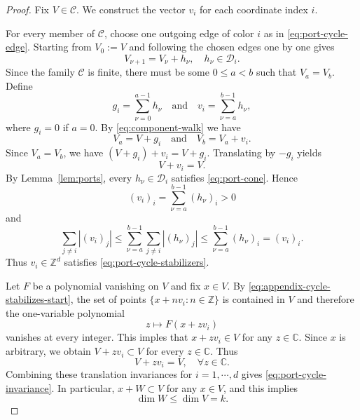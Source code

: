\documentclass[11pt,reqno]{amsart}
\newcommand\Z{\ensuremath{\mathbb{Z}}}
\newcommand\C{\ensuremath{\mathbb{C}}}
\theoremstyle{definition}
\theoremstyle{plain}
\numberwithin{equation}{section}
\begin{document}
\begin{proof}
    Fix $V\in \mathcal{C}$. We construct the vector $v_i$ for each coordinate index $i$.

    For every member of $\mathcal{C}$, choose one outgoing edge of color $i$ as in \eqref{eq:port-cycle-edge}. Starting from $V_0:=V$ and following the chosen edges one by one gives 
    \begin{equation}\label{eq:component-walk}
        V_{\nu+1}=V_{\nu}+h_\nu,\quad h_\nu \in \mathcal{D}_i.
    \end{equation}
    Since the family $\mathcal{C}$ is finite, there must be some $0\le a<b$ such that $V_a=V_b$. Define
    \begin{equation*}
        g_i=\sum_{\nu=0}^{a-1}h_\nu \quad  \text{and}\quad v_i=\sum_{\nu=a}^{b-1}h_\nu,
    \end{equation*}
    where $g_i=0$ if $a=0$. By \eqref{eq:component-walk} we have
    \begin{equation*}
        V_a=V+g_i \quad \text{and}\quad V_b=V_a+v_i.
    \end{equation*}
    Since $V_a=V_b$, we have $(V+g_i)+v_i=V+g_i$.
Translating by $-g_i$ yields
\begin{equation}\label{eq:appendix-cycle-stabilizes-start}
    V+v_i=V.
\end{equation}
By Lemma~\ref{lem:ports}, every $h_\nu \in \mathcal{D}_i$ satisfies \eqref{eq:port-cone}. Hence
\begin{equation*}
    (v_i)_i=\sum_{\nu=a}^{b-1}(h_\nu)_i>0
\end{equation*}
and
\begin{equation*}
    \sum_{j\neq i}|(v_i)_j|\le \sum_{\nu=a}^{b-1}\sum_{j\neq i}|(h_\nu)_j|\le \sum_{\nu=a}^{b-1}(h_\nu)_i=(v_i)_i.
\end{equation*}
Thus $v_i\in \Z^d$ satisfies \eqref{eq:port-cycle-stabilizers}. 

Let $F$ be a polynomial vanishing on $V$ and fix $x\in V$. By \eqref{eq:appendix-cycle-stabilizes-start}, the set of points $\lbrace x+nv_i:n\in\Z\rbrace$ is contained in $V$ and therefore the one-variable polynomial
\begin{equation*}
    z\longmapsto F(x+zv_i)
\end{equation*}
vanishes at every integer. This imples that $x+zv_i\in V$ for any $z\in \C$. Since $x$ is arbitrary, we obtain $V+zv_i\subset V$ for every $z\in \C$. Thus
\begin{equation*}
    V+zv_i=V,\quad \forall z\in \C.
\end{equation*}
Combining these translation invariances for $i=1,\cdots,d$ gives \eqref{eq:port-cycle-invariance}. In particular, $x+W\subset V$ for any $x\in V$, and this implies 
\begin{equation}\label{eq:appendix-W-dimension}
    \dim W\le \dim V=k.
\end{equation}


\end{proof}
\end{document}
